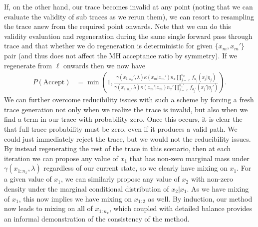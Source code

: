 If, on the other hand, our trace becomes invalid
at any point (noting that we can evaluate the validity of sub traces as we rerun them), we can resort to
resampling the trace anew from the required point onwards.  Note that we can do this validity evaluation
and regeneration during the same single forward pass through trace and that whether we do regeneration
is deterministic for given $\{x_m,x_m'\}$ pair (and thus does not affect the MH acceptance ratio by symmetry).
If we regenerate from \sample $\ell$ onwards then we now have
\begin{align}
P(\text{Accept}) &= \min\left(1, \frac{\gamma(x_{1:n_x}',\lambda) \kappa(x_m | x_{m}') n_x \prod_{j=\ell}^{n_x} f_{a_{j}} (x_j | \eta_j)}
{\gamma(x_{1:n_x},\lambda) \kappa(x_m' | x_{m})  n_x' \prod_{j=\ell}^{n_x'} f_{a_{j}'} (x_j' | \eta_j')}\right).
\end{align}
We can further overcome reducibility issues with such a scheme by forcing a fresh trace generation
not only when we realize the trace is invalid, but also when we find a term in our trace with probability zero.
Once this occurs, it is clear the that full trace probability must be zero, even if it produces a valid path.  We
could just immediately reject the trace, but we would not the reducibility issues.  By instead
regenerating the rest of the trace in this scenario, then at each iteration we can propose any value of $x_1$ that has non-zero marginal
mass under $\gamma(x_{1:n_x},\lambda)$ regardless of our current state, so we clearly have mixing on $x_1$.
For a given value of $x_1$, we can similarly propose any value of $x_2$ with non-zero density under the
marginal conditional distribution of $x_2|x_1$.  As we have mixing of $x_1$, this now implies we have
mixing on $x_{1:2}$ as well.  By induction, our method now leads to mixing on all of $x_{1:n_x}$, which
coupled with detailed balance provides an informal demonstration of the consistency of the method.

